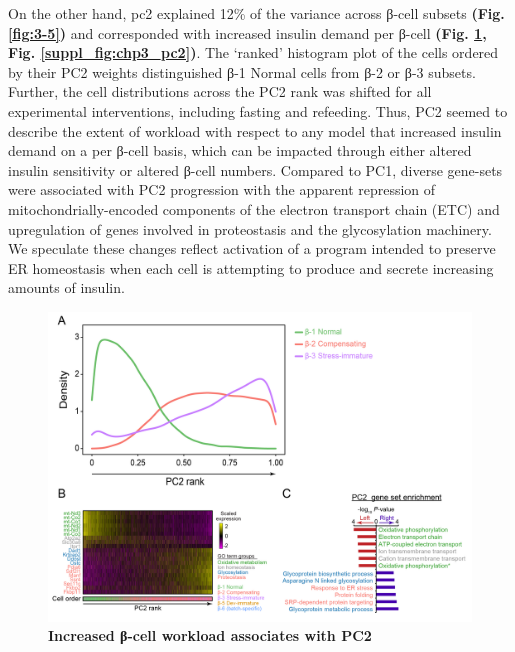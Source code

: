 
On the other hand, \gls{pc}2 explained 12\% of the variance across β-cell subsets \textbf{(Fig. \ref{fig:3-5})} and corresponded with increased insulin demand per β-cell \textbf{(Fig. \ref{fig:3-7}, Fig. \ref{suppl_fig:chp3_pc2})}. The ‘ranked’ histogram plot of the cells ordered by their PC2 weights distinguished β-1 Normal cells from β-2 or β-3 subsets. Further, the cell distributions across the PC2 rank was shifted for all experimental interventions, including fasting and refeeding. Thus, PC2 seemed to describe the extent of workload with respect to any model that increased insulin demand on a per β-cell basis, which can be impacted through either altered insulin sensitivity or altered β-cell numbers. Compared to PC1, diverse gene-sets were associated with PC2 progression with the apparent repression of mitochondrially-encoded components of the electron transport chain (ETC) and upregulation of genes involved in proteostasis and the glycosylation machinery. We speculate these changes reflect activation of a program intended to preserve ER homeostasis when each cell is attempting to produce and secrete increasing amounts of insulin.\\

\begin{figure}[H]
\centering
\includegraphics[width=\linewidth]{Chapter5/Fig/F3-6-03}
\caption[Increased β-cell workload associates with PC2]{\textbf{Increased β-cell workload associates with PC2}\\}
\label{fig:3-7}
\end{figure}

\clearpage

